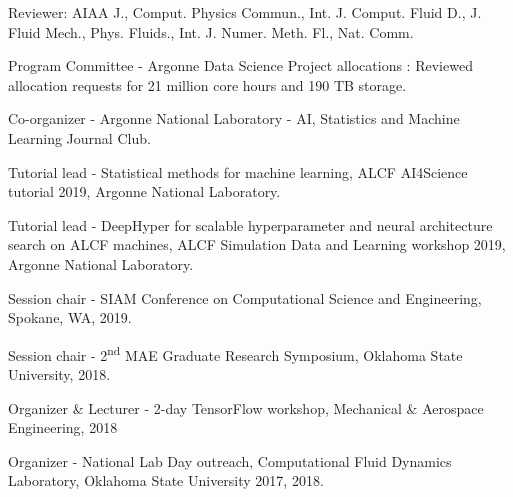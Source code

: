 \documentclass[letterpaper]{article}
\renewenvironment{itemize}{
  \begin{list}{}{
    \setlength{\leftmargin}{1.5em}
  }
}{
  \end{list}
}
\begin{document}
\begin{itemize}
    \item Reviewer: AIAA J., Comput. Physics Commun., Int. J. Comput. Fluid D., J. Fluid Mech., Phys. Fluids., Int. J. Numer. Meth. Fl., Nat. Comm.
    \item Program Committee - Argonne Data Science Project allocations : Reviewed allocation requests for 21 million core hours and 190 TB storage.
    \item Co-organizer - Argonne National Laboratory - AI, Statistics and Machine Learning Journal Club.
    \item Tutorial lead - Statistical methods for machine learning, ALCF AI4Science tutorial 2019, Argonne National Laboratory.
    \item Tutorial lead - DeepHyper for scalable hyperparameter and neural architecture search on ALCF machines, ALCF Simulation Data and Learning workshop 2019, Argonne National Laboratory.
    \item Session chair - SIAM Conference on Computational Science and Engineering, Spokane, WA, 2019.
    \item Session chair - 2\textsuperscript{nd} MAE Graduate Research Symposium, Oklahoma State University, 2018.
    \item Organizer \& Lecturer - 2-day TensorFlow workshop, Mechanical \& Aerospace Engineering, 2018
    \item Organizer - National Lab Day outreach, Computational Fluid Dynamics Laboratory, Oklahoma State University 2017, 2018.
\end{itemize}

\bigskip

\end{document}
